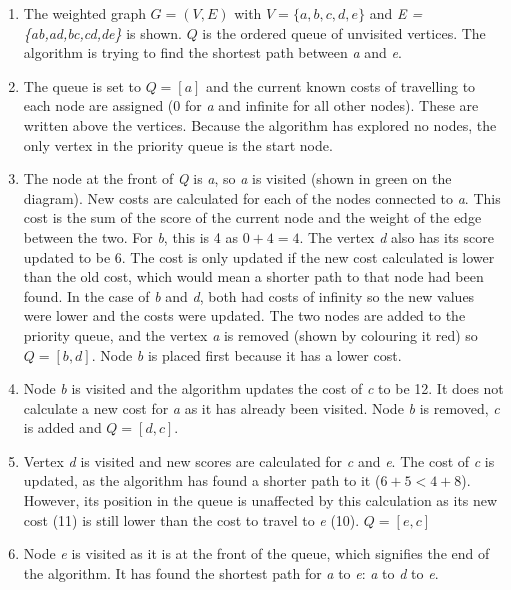 \documentclass[titlepage]{article}
\begin{document}
\begin{enumerate}
\item The weighted graph \(G = (V, E)\) with \(V = \{a,b,c,d,e\}\) and \textit{E = \{ab,ad,bc,cd,de\}} is shown. \(Q\) is the ordered queue of unvisited vertices. The algorithm is trying to find the shortest path between \textit{a} and \textit{e}. 
\item The queue is set to \(Q = [a]\) and the current known costs of travelling to each node are assigned (0 for \textit{a} and infinite for all other nodes). These are written above the vertices. Because the algorithm has explored no nodes, the only vertex in the priority queue is the start node. 
\item The node at the front of \textit{Q} is \textit{a}, so \textit{a} is visited (shown in green on the diagram). New costs are calculated for each of the nodes connected to \textit{a}. This cost is the sum of the score of the current node and the weight of the edge between the two. For \textit{b}, this is 4 as \(0 + 4 = 4\). The vertex \textit{d} also has its score updated to be 6. The cost is only updated if the new cost calculated is lower than the old cost, which would mean a shorter path to that node had been found. In the case of \textit{b} and \textit{d}, both had costs of infinity so the new values were lower and the costs were updated. The two nodes are added to the priority queue, and the vertex \textit{a} is removed (shown by colouring it red) so \(Q = [b,d]\). Node \textit{b} is placed first because it has a lower cost.
\item Node \textit{b} is visited and the algorithm updates the cost of \textit{c} to be 12. It does not calculate a new cost for \textit{a} as it has already been visited. Node \textit{b} is removed, \textit{c} is added and \(Q = [d,c]\).
\item Vertex \textit{d} is visited and new scores are calculated for \textit{c} and \textit{e}. The cost of \textit{c} is updated, as the algorithm has found a shorter path to it (\(6+5 < 4+8\)). However, its position in the queue is unaffected by this calculation as its new cost (11) is still lower than the cost to travel to \textit{e} (10). \(Q = [e,c]\)
\item Node \textit{e} is visited as it is at the front of the queue, which signifies the end of the algorithm. It has found the shortest path for \textit{a} to \textit{e}: \textit{a} to \textit{d} to \textit{e}.
\end{enumerate}
\end{document}
